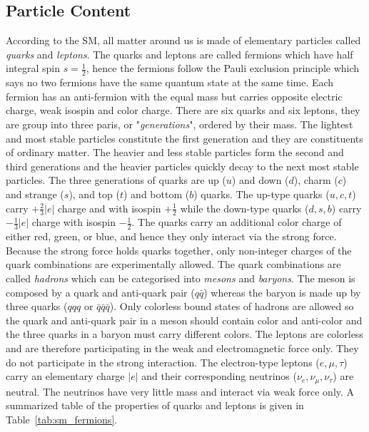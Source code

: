 \subsection{Particle Content}
\label{subsec:sm_particle_content}
According to the SM, all matter around us is made of elementary particles called \textit{quarks} and \textit{leptons}.
The quarks and leptons are called fermions which have half integral spin $s=\frac{1}{2}$, hence the fermions follow the Pauli exclusion principle which says no two fermions have the same quantum state at the same time.
Each fermion has an anti-fermion with the equal mass but carries opposite electric charge, weak isospin and color charge.
There are six quarks and six leptons, they are group into three paris, or "\textit{generations}", ordered by their mass.
The lightest and most stable particles constitute the first generation and they are constituents of ordinary matter.
The heavier and less stable particles form the second and third generations and the heavier particles quickly decay to the next most stable particles.
The three generations of quarks are up ($u$) and down ($d$), charm ($c$) and strange ($s$), and top ($t$) and bottom ($b$) quarks.
The up-type quarks ($u, c, t$) carry $+\frac{2}{3}|e|$ charge and with isospin $+\frac{1}{2}$ while the down-type quarks ($d, s, b$) carry $-\frac{1}{3}|e|$ charge with isospin $-\frac{1}{2}$.
The quarks carry an additional color charge of either red, green, or blue, and hence they only interact via the strong force.
Because the strong force holds quarks together, only non-integer charges of the quark combinations are experimentally allowed.
The quark combinations are called \textit{hadrons} which can be categorised into \textit{mesons} and \textit{baryons}.
The meson is composed by a quark and anti-quark pair ($q\bar{q}$) whereas the baryon is made up by three quarks ($qqq$ or $\bar{q}\bar{q}\bar{q}$).
Only colorless bound states of hadrons are allowed so the quark and anti-quark pair in a meson should contain color and anti-color and the three quarks in a baryon must carry different colors.
The leptons are colorless and are therefore participating in the weak and electromagnetic force only. 
They do not participate in the strong interaction.
The electron-type leptons ($e, \mu, \tau$) carry an elementary charge $|e|$ and their corresponding neutrinos ($\nu_{e}, \nu_{\mu}, \nu_{\tau}$) are neutral.
The neutrinos have very little mass and interact via weak force only.
A summarized table of the properties of quarks and leptons is given in Table~\ref{tab:sm_fermions}.

